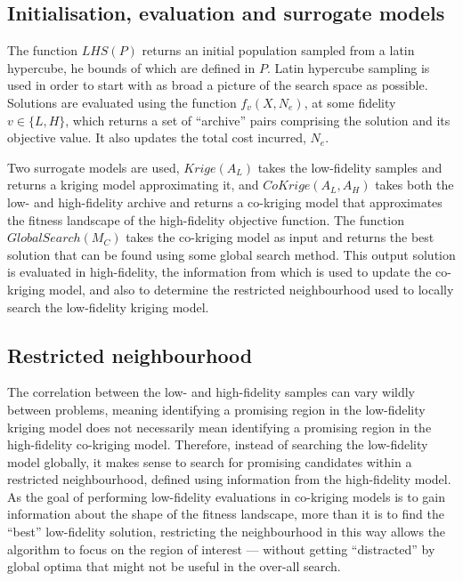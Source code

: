 \subsection{Initialisation, evaluation and surrogate models}
The function $LHS(P)$ returns an initial population sampled from a latin hypercube, he bounds of which are defined in $P$. Latin hypercube sampling is used in order to start with as broad a picture of the search space as possible. Solutions are evaluated using the function $f_v(X,N_e)$, at some fidelity $v\in \{L,H\}$, which returns a set of ``archive'' pairs comprising the solution and its objective value. It also updates the total cost incurred, $N_e$. 

Two surrogate models are used, $Krige(A_L)$ takes the low-fidelity samples and returns a kriging model approximating it, and $CoKrige(A_L,A_H)$ takes both the low- and high-fidelity archive and returns a co-kriging model that approximates the fitness landscape of the high-fidelity objective function. The function $GlobalSearch(M_C)$ takes the co-kriging model as input and returns the best solution that can be found using some global search method. This output solution is evaluated in high-fidelity, the information from which is used to update the co-kriging model, and also to determine the restricted neighbourhood used to locally search the low-fidelity kriging model.

\subsection{Restricted neighbourhood}\label{subsec:restrict}
The correlation between the low- and high-fidelity samples can vary wildly between problems, meaning identifying a promising region in the low-fidelity kriging model does not necessarily mean identifying a promising region in the high-fidelity co-kriging model. Therefore, instead of searching the low-fidelity model globally, it makes sense to search for promising candidates within a restricted neighbourhood, defined using information from the high-fidelity model. As the goal of performing low-fidelity evaluations in co-kriging models is to gain information about the shape of the fitness landscape, more than it is to find the ``best'' low-fidelity solution, restricting the neighbourhood in this way allows the algorithm to focus on the region of interest --- without getting ``distracted'' by global optima that might not be useful in the over-all search.

